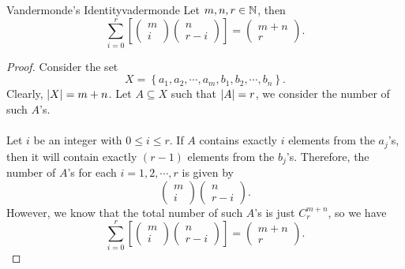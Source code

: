 \documentclass[math]{amznotes}
\theoremstyle{remark}
\begin{document}
\begin{thmbox}{Vandermonde's Identity}{vadermonde}
    Let $m, n, r \in \mathbb{N}$, then
    \begin{equation*}
        \sum_{i = 0}^{r}\left[\begin{pmatrix}
            m \\
            i
        \end{pmatrix}\begin{pmatrix}
            n \\
            r - i
        \end{pmatrix}\right] = \begin{pmatrix}
            m + n \\
            r
        \end{pmatrix}.
    \end{equation*}
    \tcblower   
    \begin{proof}
        Consider the set
        \begin{displaymath}
            X = \left\{a_1, a_2, \cdots, a_m, b_1, b_2, \cdots, b_n\right\}.
        \end{displaymath}
        Clearly, ${\left\lvert {X} \right\rvert} = m + n$. Let $A \subseteq X$ such that ${\left\lvert {A} \right\rvert} = r$, we consider the number of such $A$'s.
        \\\\
        Let $i$ be an integer with $0 \leq i \leq r$. If $A$ contains exactly $i$ elements from the $a_j$'s, then it will contain exactly $(r - 1)$ elements from the $b_j$'s. Therefore, the number of $A$'s for each $i = 1, 2, \cdots, r$ is given by
        \begin{equation*}
            \begin{pmatrix}
                m \\
                i
            \end{pmatrix}\begin{pmatrix}
                n \\
                r - i
            \end{pmatrix}.
        \end{equation*}
        However, we know that the total number of such $A$'s is just $C^{m + n}_r$, so we have
        \begin{equation*}
            \sum_{i = 0}^{r}\left[\begin{pmatrix}
                m \\
                i
            \end{pmatrix}\begin{pmatrix}
                n \\
                r - i
            \end{pmatrix}\right] = \begin{pmatrix}
                m + n \\
                r
            \end{pmatrix}.
        \end{equation*}
    \end{proof}
\end{thmbox}
\end{document}
